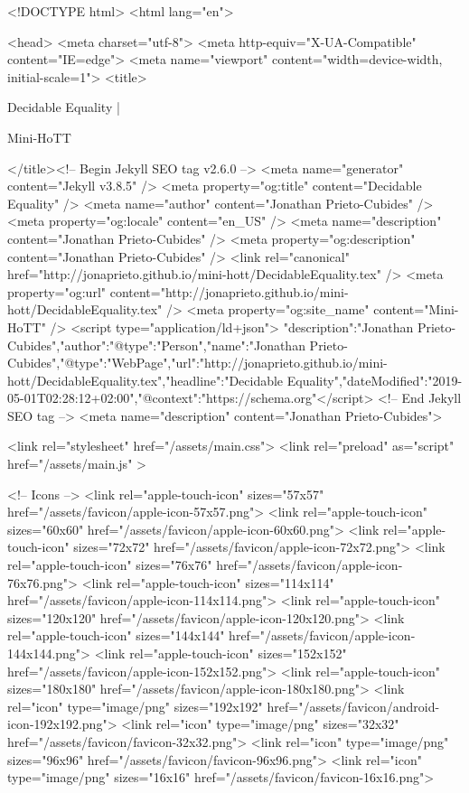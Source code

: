 <!DOCTYPE html>
<html lang="en">

<head>
  <meta charset="utf-8">
  <meta http-equiv="X-UA-Compatible" content="IE=edge">
  <meta name="viewport" content="width=device-width, initial-scale=1">
  <title>
    
      
        Decidable Equality |
      
        Mini-HoTT
    
  </title><!-- Begin Jekyll SEO tag v2.6.0 -->
<meta name="generator" content="Jekyll v3.8.5" />
<meta property="og:title" content="Decidable Equality" />
<meta name="author" content="Jonathan Prieto-Cubides" />
<meta property="og:locale" content="en_US" />
<meta name="description" content="Jonathan Prieto-Cubides" />
<meta property="og:description" content="Jonathan Prieto-Cubides" />
<link rel="canonical" href="http://jonaprieto.github.io/mini-hott/DecidableEquality.tex" />
<meta property="og:url" content="http://jonaprieto.github.io/mini-hott/DecidableEquality.tex" />
<meta property="og:site_name" content="Mini-HoTT" />
<script type="application/ld+json">
{"description":"Jonathan Prieto-Cubides","author":{"@type":"Person","name":"Jonathan Prieto-Cubides"},"@type":"WebPage","url":"http://jonaprieto.github.io/mini-hott/DecidableEquality.tex","headline":"Decidable Equality","dateModified":"2019-05-01T02:28:12+02:00","@context":"https://schema.org"}</script>
<!-- End Jekyll SEO tag -->
<meta name="description" content="Jonathan Prieto-Cubides">

  <link rel="stylesheet" href="/assets/main.css">
  <link rel="preload" as="script" href="/assets/main.js" >

  <!-- Icons -->
  <link rel="apple-touch-icon" sizes="57x57" href="/assets/favicon/apple-icon-57x57.png">
  <link rel="apple-touch-icon" sizes="60x60" href="/assets/favicon/apple-icon-60x60.png">
  <link rel="apple-touch-icon" sizes="72x72" href="/assets/favicon/apple-icon-72x72.png">
  <link rel="apple-touch-icon" sizes="76x76" href="/assets/favicon/apple-icon-76x76.png">
  <link rel="apple-touch-icon" sizes="114x114" href="/assets/favicon/apple-icon-114x114.png">
  <link rel="apple-touch-icon" sizes="120x120" href="/assets/favicon/apple-icon-120x120.png">
  <link rel="apple-touch-icon" sizes="144x144" href="/assets/favicon/apple-icon-144x144.png">
  <link rel="apple-touch-icon" sizes="152x152" href="/assets/favicon/apple-icon-152x152.png">
  <link rel="apple-touch-icon" sizes="180x180" href="/assets/favicon/apple-icon-180x180.png">
  <link rel="icon" type="image/png" sizes="192x192"  href="/assets/favicon/android-icon-192x192.png">
  <link rel="icon" type="image/png" sizes="32x32" href="/assets/favicon/favicon-32x32.png">
  <link rel="icon" type="image/png" sizes="96x96" href="/assets/favicon/favicon-96x96.png">
  <link rel="icon" type="image/png" sizes="16x16" href="/assets/favicon/favicon-16x16.png">

